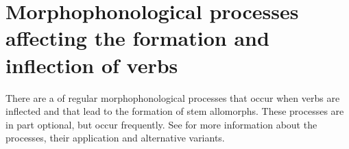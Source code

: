 
\section[Morphophonological processes affecting verb formation and inflection]{Morphophonological processes affecting the formation and inflection of verbs}
\label{sec:Morphophonological processes affecting the formation and inflection of verbs}

There are a  of regular morphophonological processes that occur when verbs are inflected and that lead to the formation of stem allomorphs. These processes are in part optional, but occur frequently. See  for more information about the processes, their application and alternative variants.

